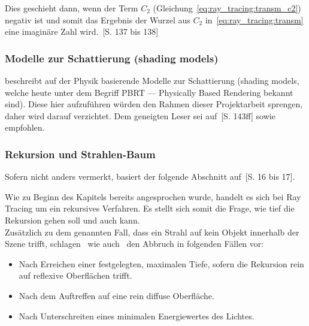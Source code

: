 Dies geschieht dann, wenn der Term $C_{2}$
(Gleichung~\ref{eq:ray_tracing:transm_c2}) negativ ist und somit das
Ergebnis der Wurzel aus $C_{2}$ in~\ref{eq:ray_tracing:transm} eine
imaginäre Zahl wird.~\cite{glassner_introduction_1989}[S. 137 bis 138]


\subsubsection{Modelle zur Schattierung (shading models)}
\label{ssubsec:ray_tracing:shading_models}

\citeauthor{glassner_introduction_1989} beschreibt auf der Physik
basierende Modelle zur Schattierung (shading models, welche heute unter
dem Begriff PBRT --- Physically Based Rendering bekannt sind). Diese
hier aufzuführen würden den Rahmen dieser Projektarbeit sprengen, daher
wird darauf verzichtet. Dem geneigten Leser sei
auf~[S. 143ff]
sowie~ empfohlen.

\subsubsection{Rekursion und Strahlen-Baum}
\label{ssubsec:ray_tracing:recursion}

Sofern nicht anders vermerkt, basiert der folgende Abschnitt
auf~\cite{glassner_introduction_1989}[S. 16 bis 17].

Wie zu Beginn des Kapitels bereits angesprochen wurde, handelt es sich
bei Ray Tracing um ein rekursives Verfahren. Es stellt sich somit die
Frage, wie tief die Rekursion gehen soll und auch kann.\\
Zusätzlich zu dem genannten Fall, dass ein Strahl auf kein Objekt
innerhalb der Szene trifft, schlagen~\citeauthor{whitted_improved_1980}
wie auch~\citeauthor{glassner_introduction_1989} den Abbruch in
folgenden Fällen vor:
\begin{itemize}
        \item{Nach Erreichen einer festgelegten, maximalen Tiefe},
            sofern die Rekursion rein auf reflexive Oberflächen trifft.
        \item{Nach dem Auftreffen auf eine rein diffuse Oberfläche.}
        \item{Nach Unterschreiten eines minimalen Energiewertes des
                Lichtes.}
\end{itemize}

